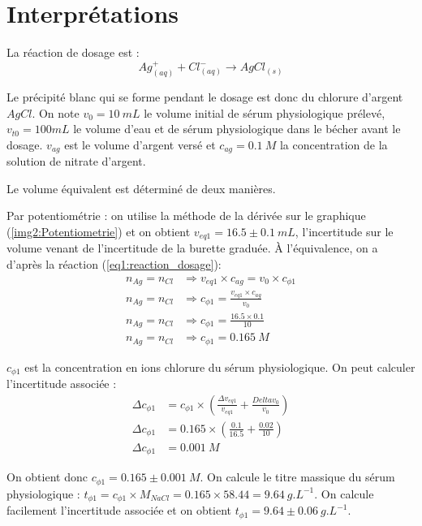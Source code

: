 \documentclass[12pt]{article}
\begin{document}
\newpage
\section{Interprétations}

La réaction de dosage est :
\begin{equation}
    Ag^+_{(aq)} + Cl^-_{(aq)} \longrightarrow AgCl_{(s)}
    \label{eq1:reaction_dosage}
\end{equation}

Le précipité blanc qui se forme pendant le dosage est donc du chlorure d'argent $AgCl$.
On note $v_0=10 \ mL$ le volume initial de sérum physiologique prélevé, $v_{t0}=100 mL$ le volume d'eau et de sérum physiologique dans le bécher avant le dosage.
$v_{ag}$ est le volume d'argent versé et $c_{ag}=0.1 \ M$ la concentration de la solution de nitrate d'argent. 

Le volume équivalent est déterminé de deux manières. 

Par potentiométrie : on utilise la méthode de la dérivée sur le graphique (\ref{img2:Potentiometrie}) et on obtient $v_{eq1}= 16.5 \pm 0.1 \ mL $, l'incertitude sur le volume venant de l'incertitude de la burette graduée.
À l'équivalence, on a d'après la réaction (\ref{eq1:reaction_dosage}):
\begin{align*}
    n_{Ag}=n_{Cl} & \Longrightarrow  v_{eq1} \times c_{ag} = v_{0} \times c_{\phi 1} \\ 
    n_{Ag}=n_{Cl} & \Longrightarrow  c_{\phi 1} = \frac{v_{eq1} \times c_{ag}}{v_{0}} \\
    n_{Ag}=n_{Cl} & \Longrightarrow  c_{\phi 1} = \frac{16.5 \times 0.1}{10} \\
    n_{Ag}=n_{Cl} & \Longrightarrow  c_{\phi 1} = 0.165  \ M
\end{align*}

$c_{\phi 1}$ est la concentration en ions chlorure du sérum physiologique. 
On peut calculer l'incertitude associée :
\begin{align*}
    \Delta c_{\phi 1} & = c_{\phi 1} \times \left(\frac{\Delta v_{eq1}}{v_{eq1}} + \frac{Delta v_0}{v_0} \right) \\
    \Delta c_{\phi 1} & = 0.165 \times \left( \frac{0.1}{16.5} + \frac{0.02}{10} \right) \\
    \Delta c_{\phi 1} & = 0.001 \ M
\end{align*}

On obtient donc $c_{\phi 1}= 0.165 \pm 0.001 \ M$.
On calcule le titre massique du sérum physiologique : $t_{\phi 1}=c_{\phi 1} \times M_{NaCl}=0.165 \times 58.44 = 9.64 \ g.L^{-1}$.
On calcule facilement l'incertitude associée et on obtient $t_{\phi 1}=9.64 \pm 0.06 \ g.L^{-1}$.
\end{document}
